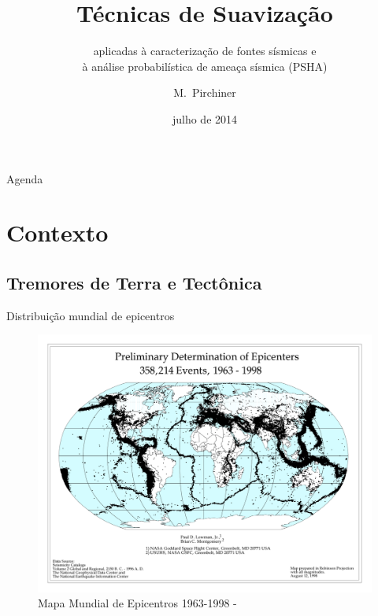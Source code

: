 \documentclass[ucs,8pt]{beamer}
\title[Smoothing Techniques] %
{Técnicas de Suavização}
\subtitle
{aplicadas à caracterização de fontes sísmicas e \\ 
 à análise probabilística de ameaça sísmica (PSHA)}
\author[Pirchiner, Marlon] %
{M.~Pirchiner }
\institute[EMAp-FGV / IAG-USP] %
{EMAp-FGV / Centro de Sismologia - USP}
\date[EMAP2014] %
{julho de 2014}
\begin{document}
\begin{frame}[plain]
  \titlepage
\end{frame}

\begin{frame}{Agenda}
  \tableofcontents
\end{frame}


\section{Contexto}
\subsection{Tremores de Terra e Tectônica}

\begin{frame}{Distribuição mundial de epicentros}
\begin{figure}[H]
   \centering
   \includegraphics[height=0.95\textheight]{global_pde_mag_all}
   \caption[Mapa Mundial de Epicentros 1963-1998]
   		   {Mapa Mundial de Epicentros 1963-1998 - \citet{lowman_jr_1998}} 
   \label{f:global_epicenters}
\end{figure} 
\end{frame}
\end{document}

